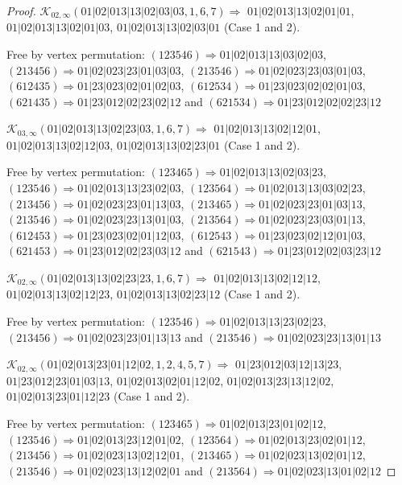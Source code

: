 \documentclass[12pt]{article}
\theoremstyle{plain}
\theoremstyle{definition}
\theoremstyle{remark}
\newcommand{\fancy}[1]{\mathcal{#1}}
\def\K{\fancy{K}}
\begin{document}
\begin{proof}
	
	\bigskip
	
	$\K_{02,\infty}(01|02|013|13|02|03|03,1, 6, 7)\Rightarrow $ $01|02|013|13|02|01|01$, $01|02|013|13|02|01|03$, $01|02|013|13|02|03|01$ (Case 1 and 2).
	
	
	
	Free by vertex permutation: $(1 2 3 5 4 6)\Rightarrow 01|02|013|13|03|02|03$, $(2 1 3 4 5 6)\Rightarrow 01|02|023|23|01|03|03$, $(2 1 3 5 4 6)\Rightarrow 01|02|023|23|03|01|03$, $(6 1 2 4 3 5)\Rightarrow 01|23|023|02|01|02|03$, $(6 1 2 5 3 4)\Rightarrow 01|23|023|02|02|01|03$, $(6 2 1 4 3 5)\Rightarrow 01|23|012|02|23|02|12$ and $(6 2 1 5 3 4)\Rightarrow 01|23|012|02|02|23|12$
	
	
	\bigskip
	
	$\K_{03,\infty}(01|02|013|13|02|23|03,1, 6, 7)\Rightarrow $ $01|02|013|13|02|12|01$, $01|02|013|13|02|12|03$, $01|02|013|13|02|23|01$ (Case 1 and 2).
	
	
	
	Free by vertex permutation: $(1 2 3 4 6 5)\Rightarrow 01|02|013|13|02|03|23$, $(1 2 3 5 4 6)\Rightarrow 01|02|013|13|23|02|03$, $(1 2 3 5 6 4)\Rightarrow 01|02|013|13|03|02|23$, $(2 1 3 4 5 6)\Rightarrow 01|02|023|23|01|13|03$, $(2 1 3 4 6 5)\Rightarrow 01|02|023|23|01|03|13$, $(2 1 3 5 4 6)\Rightarrow 01|02|023|23|13|01|03$, $(2 1 3 5 6 4)\Rightarrow 01|02|023|23|03|01|13$, $(6 1 2 4 5 3)\Rightarrow 01|23|023|02|01|12|03$, $(6 1 2 5 4 3)\Rightarrow 01|23|023|02|12|01|03$, $(6 2 1 4 5 3)\Rightarrow 01|23|012|02|23|03|12$ and $(6 2 1 5 4 3)\Rightarrow 01|23|012|02|03|23|12$
	
	
	\bigskip
	
	$\K_{02,\infty}(01|02|013|13|02|23|23,1, 6, 7)\Rightarrow $ $01|02|013|13|02|12|12$, $01|02|013|13|02|12|23$, $01|02|013|13|02|23|12$ (Case 1 and 2).
	
	
	
	Free by vertex permutation: $(1 2 3 5 4 6)\Rightarrow 01|02|013|13|23|02|23$, $(2 1 3 4 5 6)\Rightarrow 01|02|023|23|01|13|13$ and $(2 1 3 5 4 6)\Rightarrow 01|02|023|23|13|01|13$
	
	
	\bigskip
	
	$\K_{02,\infty}(01|02|013|23|01|12|02,1, 2, 4, 5, 7)\Rightarrow $ $01|23|012|03|12|13|23$, $01|23|012|23|01|03|13$, $01|02|013|02|01|12|02$, $01|02|013|23|13|12|02$, $01|02|013|23|01|12|23$ (Case 1 and 2).
	
	
	
	Free by vertex permutation: $(1 2 3 4 6 5)\Rightarrow 01|02|013|23|01|02|12$, $(1 2 3 5 4 6)\Rightarrow 01|02|013|23|12|01|02$, $(1 2 3 5 6 4)\Rightarrow 01|02|013|23|02|01|12$, $(2 1 3 4 5 6)\Rightarrow 01|02|023|13|02|12|01$, $(2 1 3 4 6 5)\Rightarrow 01|02|023|13|02|01|12$, $(2 1 3 5 4 6)\Rightarrow 01|02|023|13|12|02|01$ and $(2 1 3 5 6 4)\Rightarrow 01|02|023|13|01|02|12$
	

\end{proof}
\end{document}
